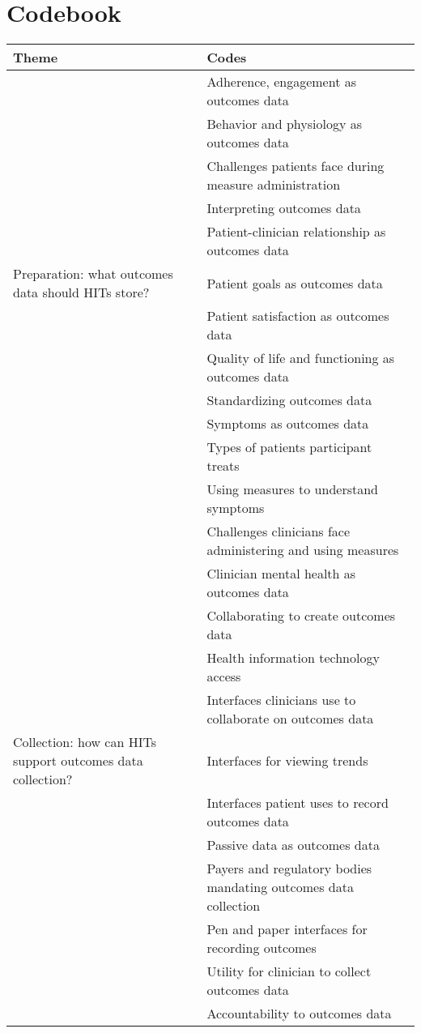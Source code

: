 \clearpage
\section{Codebook}
\label{appendix:codebook}
\begin{table}[!htbp]
\begin{tabular}{l|l}
\toprule
\textbf{Theme} & \textbf{Codes} \\
\midrule
& Adherence, engagement as outcomes data \\
& Behavior and physiology as outcomes data \\
& Challenges patients face during measure administration \\
& Interpreting outcomes data \\
& Patient-clinician relationship as outcomes data \\
Preparation: what outcomes data should HITs store?  & Patient goals as outcomes data \\
& Patient satisfaction as outcomes data \\
& Quality of life and functioning as outcomes data \\
& Standardizing outcomes data \\
& Symptoms as outcomes data \\
& Types of patients participant treats \\
& Using measures to understand symptoms \\
\midrule
& Challenges clinicians face administering and using measures \\
& Clinician mental health as outcomes data \\
& Collaborating to create outcomes data \\
& Health information technology access \\
& Interfaces clinicians use to collaborate on outcomes data \\
Collection: how can HITs support outcomes data collection? & Interfaces for viewing trends \\
& Interfaces patient uses to record outcomes data \\
& Passive data as outcomes data \\
& Payers and regulatory bodies mandating outcomes data collection \\
& Pen and paper interfaces for recording outcomes \\
& Utility for clinician to collect outcomes data \\
\midrule
& Accountability to outcomes data \\

\end{tabular}
\end{table}
